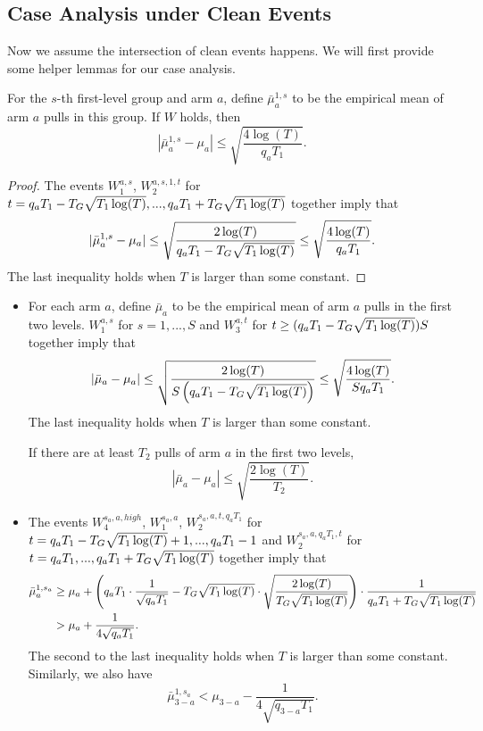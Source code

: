 \subsection{Case Analysis under Clean Events}
Now we assume the intersection of clean events happens. We will first
provide some helper lemmas for our case analysis.

\begin{lemma}
  For the $s$-th first-level group and arm $a$, define
  $\bar{\mu}_a^{1,s}$ to be the empirical mean of arm $a$ pulls in
  this group. If $W$ holds, then
  \[
    |\bar{\mu}_a^{1,s} - \mu_a| \leq \sqrt{\frac{4\log(T)}{q_a T_1}}.
  \]
\end{lemma}

\begin{proof}
  The events $W_1^{a,s}$, $W_2^{a,s,1,t}$ for
  $t = q_a T_1- T_G \sqrt{T_1\log(T)},...,q_a T_1 + T_G
  \sqrt{T_1\log(T)}$ together imply that
\[
|\bar{\mu}_a^{1,s} - \mu_a| \leq \sqrt{\frac{2\log(T)}{q_a T_1- T_G \sqrt{T_1\log(T)}}} \leq \sqrt{\frac{4\log(T)}{q_a T_1}}.
\]
The last inequality holds when $T$ is larger than some constant.
\end{proof}


\begin{itemize}

\item For each arm $a$, define $\bar{\mu}_a$ to be the empirical mean of arm $a$ pulls in the first two levels. $W_1^{a,s}$ for $s=1,...,S$ and $W_3^{a,t}$ for $t \geq  (q_a T_1- T_G \sqrt{T_1\log(T)})S$ together imply that
\[
|\bar{\mu}_a - \mu_a| \leq \sqrt{\frac{2\log(T)}{S\left(q_a T_1- T_G \sqrt{T_1\log(T)}\right)}} \leq \sqrt{\frac{4\log(T)}{S q_a T_1}} .
\]
The last inequality holds when $T$ is larger than some constant.

If there are at least $T_2$ pulls of arm $a$ in the first two levels, 
\[
|\bar{\mu}_a-\mu_a| \leq \sqrt{\frac{2\log(T)}{T_2}}. 
\]

\item %
  The events $W_4^{s_a,a,high}$, $W_1^{s_a,a}$,
  $W_2^{s_a,a,t, q_aT_1}$ for
  $t = q_a T_1- T_G \sqrt{T_1\log(T)}+1, ...,q_aT_1-1$ and
  $W_2^{s_a,a,q_aT_1,t}$ for
  $t= q_aT_1,...,q_a T_1+ T_G \sqrt{T_1\log(T)}$ together imply that
\begin{align*}
\bar{\mu}_a ^{1,s_a} &\geq \mu_a + \left(q_aT_1 \cdot \frac{1}{\sqrt{q_aT_1}} - T_G \sqrt{T_1\log(T)} \cdot \sqrt{\frac{2\log(T)}{ T_G \sqrt{T_1\log(T)}}} \right) \cdot \frac{1}{q_a T_1+ T_G \sqrt{T_1\log(T)}} \\
&> \mu_a + \frac{1}{4\sqrt{q_aT_1}}.
\end{align*}
The second to the last inequality holds when $T$ is larger than some constant.
Similarly, we also have
\[
\bar{\mu}_{3-a} ^{1,s_a} < \mu_{3-a}   - \frac{1}{4\sqrt{q_{3-a} T_1}}.
\]
\end{itemize}




